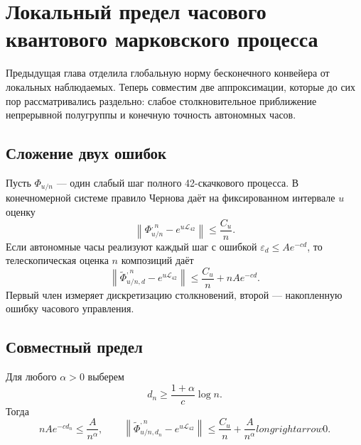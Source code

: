 \chapter{Локальный предел часового квантового марковского процесса}
\label{ch:v8-local-observable-clocked-qms-limit-and-time-anchor-gate}

Предыдущая глава отделила глобальную норму бесконечного конвейера от
локальных наблюдаемых. Теперь совместим две аппроксимации, которые до сих
пор рассматривались раздельно: слабое столкновительное приближение
непрерывной полугруппы и конечную точность автономных часов.

\section{Сложение двух ошибок}

Пусть $\Phi_{u/n}$ --- один слабый шаг полного 42-скачкового процесса.
В конечномерной системе правило Чернова даёт на фиксированном интервале
$u$ оценку
\begin{equation}
 \left\|\Phi_{u/n}^{,n}-e^{u\mathcal L_{42}}\right\|
 \leq \frac{C_u}{n}.
 \label{eq:v8-clocked-qms-collision-error}
\end{equation}
Если автономные часы реализуют каждый шаг с ошибкой
$\varepsilon_d\leq Ae^{-cd}$, то телескопическая оценка $n$ композиций
даёт
\begin{equation}
 \boxed{
 \left\|\widetilde\Phi_{u/n,d}^{,n}-e^{u\mathcal L_{42}}\right\|
 \leq \frac{C_u}{n}+nAe^{-cd}.}
 \label{eq:v8-clocked-qms-total-error}
\end{equation}
Первый член измеряет дискретизацию столкновений, второй --- накопленную
ошибку часового управления.

\section{Совместный предел}

Для любого $\alpha>0$ выберем
\begin{equation}
 d_n\geq \frac{1+\alpha}{c}\log n.
 \label{eq:v8-clocked-qms-dimension-schedule}
\end{equation}
Тогда
\begin{equation}
 nAe^{-cd_n}\leq \frac{A}{n^\alpha},
 \qquad
 \left\|\widetilde\Phi_{u/n,d_n}^{,n}
 -e^{u\mathcal L_{42}}\right\|
 \leq \frac{C_u}{n}+\frac{A}{n^\alpha}longrightarrow0.
 \label{eq:v8-clocked-qms-joint-limit}
\end{equation}

